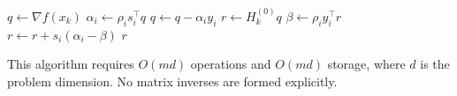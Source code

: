 \documentclass[a4paper, 10pt, dvipdfmx,draft]{article}
\begin{document}
\begin{algorithm}[htbp]
    \caption{Two-Loop Recursion for $r = H_k q$}
    \begin{algorithmic}[1]
        \STATE $q \gets \nabla f(x_k)$
        \STATE $\alpha_i \gets \rho_i s_i^\top q$
        \STATE $q \gets q - \alpha_i y_i$
        \ENDFOR
        \STATE $r \gets H_k^{(0)} q$
        \STATE $\beta \gets \rho_i y_i^\top r$
        \STATE $r \gets r + s_i (\alpha_i - \beta)$
        \ENDFOR
        \RETURN $r$
    \end{algorithmic}
\end{algorithm}

This algorithm requires $O(md)$ operations and $O(md)$ storage, where $d$ is the problem dimension.
No matrix inverses are formed explicitly.
\end{document}
